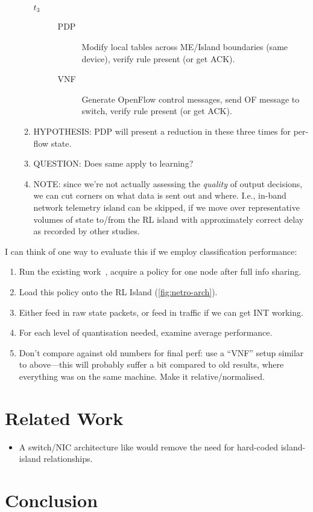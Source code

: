 \documentclass[sigconf,natbib=false]{acmart}
\begin{document}
\begin{itemize}
\begin{enumerate}
\begin{description}
			\item[$t_3$]
			\begin{description}
				\item[PDP] Modify local tables across ME/Island boundaries (same device), verify rule present (or get ACK).
				\item[VNF] Generate OpenFlow control messages, send OF message to switch, verify rule present (or get ACK).
			\end{description}
		\end{description}
		\item HYPOTHESIS: PDP will present a reduction in these three times for per-flow state.
		\item QUESTION: Does same apply to learning?
		\item NOTE: since we're not actually assessing the \emph{quality} of output decisions, we can cut corners on what data is sent out and where. I.e., in-band network telemetry island can be skipped, if we move over representative volumes of state to/from the RL island with approximately correct delay as recorded by other studies.
	\end{enumerate}
\end{itemize}
I can think of one way to evaluate this if we employ classification performance:
\begin{enumerate}
	\item Run the existing work~\cite{DBLP:journals/tnsm/SimpsonRP20}, acquire a policy for one node after full info sharing.
	\item Load this policy onto the RL Island (\cref{fig:netro-arch}).
	\item Either feed in raw state packets, or feed in traffic if we can get INT working.
	\item For each level of quantisation needed, examine average performance.
	\item Don't compare against old numbers for final perf: use a ``VNF'' setup similar to above---this will probably suffer a bit compared to old results, where everything was on the same machine. Make it relative/normalised.
\end{enumerate}

\section{Related Work}

\begin{itemize}
	\item A switch/NIC architecture like \textcite{DBLP:conf/hotnets/StephensAS18} would remove the need for hard-coded island-island relationships.
\end{itemize}

\section{Conclusion}
	
%
%
\printbibliography
	
\end{document}
